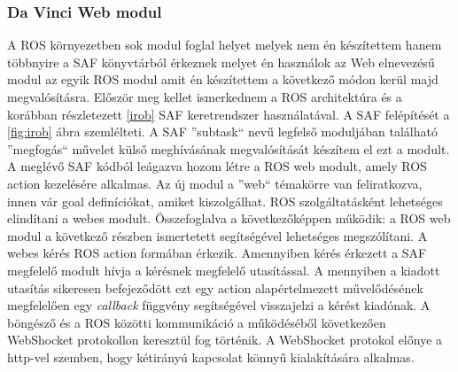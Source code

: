 \documentclass[12pt,a4paper,oneside]{report} %
\begin{document}
\subsubsection{Da Vinci Web modul}
A ROS környezetben sok modul foglal helyet melyek nem én készítettem hanem többnyire a SAF könyvtárból érkeznek melyet én használok az Web elnevezésű modul az egyik ROS modul amit én készítettem a következő módon kerül majd megvalósításra. 
Először meg kellet ismerkednem a ROS architektúra és a korábban részletezett \ref{irob} SAF keretrendszer használatával.
A SAF felépítését a \ref{fig:irob} ábra szemlélteti. A SAF ''subtask`` nevű legfelső moduljában található ''megfogás`` művelet külső meghívásának megvalósítását készítem el ezt a modult. A meglévő SAF kódból leágazva hozom létre a ROS web modult, amely ROS action kezelésére alkalmas. Az új modul a ''web`` témakörre van feliratkozva, innen vár goal definíciókat, amiket kiszolgálhat. ROS szolgáltatásként lehetséges elindítani a webes modult. Összefoglalva a következőképpen működik: a ROS web modul a következő részben ismertetett  segítségével lehetséges megszólítani. A webes kérés ROS action formában érkezik. Amennyiben kérés érkezett a SAF  megfelelő modult hívja a kérésnek megfelelő utasítással. A mennyiben a kiadott utasítás sikeresen befejeződött ezt egy action alapértelmezett művelődésének megfelelően egy \textit{callback} függvény segítségével visszajelzi a kérést kiadónak. A böngésző és a  ROS közötti kommunikáció a  működéséből következően WebShocket protokollon keresztül fog történik. A WebShocket protokol előnye a http-vel szemben, hogy kétirányú kapcsolat könnyű kialakítására alkalmas.
\end{document}
